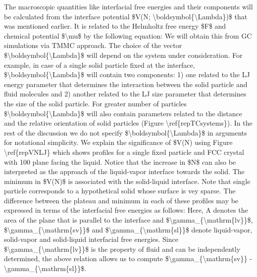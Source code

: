 \par The macroscopic quantities like interfacial free energies and their components will be calculated from the interface potential \$V(N; \textbackslash boldsymbol\{\textbackslash Lambda\})\$ that was mentioned earlier. It is related to the Helmholtz free energy \$F\$ and chemical potential \$\textbackslash mu\$ by the following equation: We will obtain this from GC simulations via TMMC approach. The choice of the vector \$\textbackslash boldsymbol\{\textbackslash Lambda\}\$ will depend on the system under consideration. For example, in case of a single solid particle fixed at the interface, \$\textbackslash boldsymbol\{\textbackslash Lambda\}\$ will contain two components: 1) one related to the LJ energy parameter that determines the interaction between the solid particle and fluid molecules and 2) another related to the LJ size parameter that determines the size of the solid particle. For greater number of particles \$\textbackslash boldsymbol\{\textbackslash Lambda\}\$ will also contain parameters related to the distance and the relative orientation of solid particles (Figure \textbackslash ref\{repTCsystems\}). In the rest of the discussion we do not specify \$\textbackslash boldsymbol\{\textbackslash Lambda\}\$ in arguments for notational simplicity. We explain the significance of \$V(N) using Figure \textbackslash ref\{repVNLJ\} which shows profiles for a single fixed particle and FCC crystal with 100 plane facing the liquid. Notice that the increase in \$N\$ can also be interpreted as the approach of the liquid-vapor interface towards the solid. The minimum in \$V(N)\$ is associated with the solid-liquid interface. Note that single particle corresponds to a hypothetical solid whose surface is vey sparse. The difference between the plateau and minimum in each of these profiles may be expressed in terms of the interfacial free energies as follows: Here, A denotes the area of the plane that is parallel to the interface and \$\textbackslash gamma\_\{\textbackslash mathrm\{lv\}\}\$, \$\textbackslash gamma\_\{\textbackslash mathrm\{sv\}\}\$ and \$\textbackslash gamma\_\{\textbackslash mathrm\{sl\}\}\$ denote liquid-vapor, solid-vapor and solid-liquid interfacial free energies. Since \$\textbackslash gamma\_\{\textbackslash mathrm\{lv\}\}\$ is the property of fluid and can be independently determined, the above relation allows us to compute \$\textbackslash gamma\_\{\textbackslash mathrm\{sv\}\} - \textbackslash gamma\_\{\textbackslash mathrm\{sl\}\}\$.
